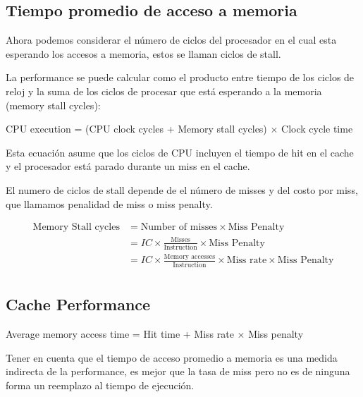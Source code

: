 \subsection{Tiempo promedio de acceso a memoria}
Ahora podemos considerar el número de ciclos del procesador en el cual esta esperando los accesos a memoria, estos se llaman ciclos de stall.

La performance se puede calcular como el producto entre tiempo de los ciclos de reloj y la suma de los ciclos de procesar que está esperando a la memoria (memory stall cycles):

CPU execution =  (CPU clock cycles + Memory stall cycles) $\times$ Clock cycle time

Esta ecuación asume que los ciclos de CPU incluyen el tiempo de hit en el cache y el procesador está parado durante un miss en el cache.

El numero de ciclos de stall depende de el número de misses y del costo por miss, que llamamos penalidad de miss o miss penalty.

\begin{align*}
  \text{Memory Stall cycles} &= \text{Number of misses} \times \text{Miss Penalty} \\
   &= IC \times \frac{\text{Misses}}{\text{Instruction}} \times \text{Miss Penalty}\\
   &= IC \times \frac{\text{Memory accesses}}{\text{Instruction}} \times \text{Miss rate} \times \text{Miss Penalty}\\
\end{align*}

\subsection{Cache Performance}

Average memory access time = Hit time + Miss rate $\times$ Miss penalty

Tener en cuenta que el tiempo de acceso promedio a memoria es una medida indirecta de la performance, es mejor que la tasa de miss pero no es de ninguna forma un reemplazo al tiempo de ejecución.

